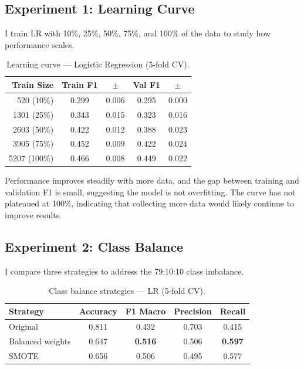 \documentclass[12pt]{article}
\begin{document}
\subsection{Experiment 1: Learning Curve}

I train LR with 10\%, 25\%, 50\%, 75\%, and 100\% of the data to study how performance scales.

\begin{table}[H]
\centering
\caption{Learning curve --- Logistic Regression (5-fold CV).}
\label{tab:learning}
\begin{tabular}{rcccc}
\toprule
\textbf{Train Size} & \textbf{Train F1} & $\pm$ & \textbf{Val F1} & $\pm$ \\
\midrule
520  (10\%) & 0.299 & 0.006 & 0.295 & 0.000 \\
1301 (25\%) & 0.343 & 0.015 & 0.323 & 0.016 \\
2603 (50\%) & 0.422 & 0.012 & 0.388 & 0.023 \\
3905 (75\%) & 0.452 & 0.009 & 0.422 & 0.024 \\
5207 (100\%) & 0.466 & 0.008 & 0.449 & 0.022 \\
\bottomrule
\end{tabular}
\end{table}

Performance improves steadily with more data, and the gap between training and validation F1 is small, suggesting the model is not overfitting.
The curve has not plateaued at 100\%, indicating that collecting more data would likely continue to improve results.

\subsection{Experiment 2: Class Balance}

I compare three strategies to address the 79:10:10 class imbalance.

\begin{table}[H]
\centering
\caption{Class balance strategies --- LR (5-fold CV).}
\label{tab:balance}
\begin{tabular}{lcccc}
\toprule
\textbf{Strategy} & \textbf{Accuracy} & \textbf{F1 Macro} & \textbf{Precision} & \textbf{Recall} \\
\midrule
Original           & 0.811 & 0.432 & 0.703 & 0.415 \\
Balanced weights   & 0.647 & \textbf{0.516} & 0.506 & \textbf{0.597} \\
SMOTE~\citep{chawla2002smote} & 0.656 & 0.506 & 0.495 & 0.577 \\
\bottomrule
\end{tabular}
\end{table}
\end{document}
